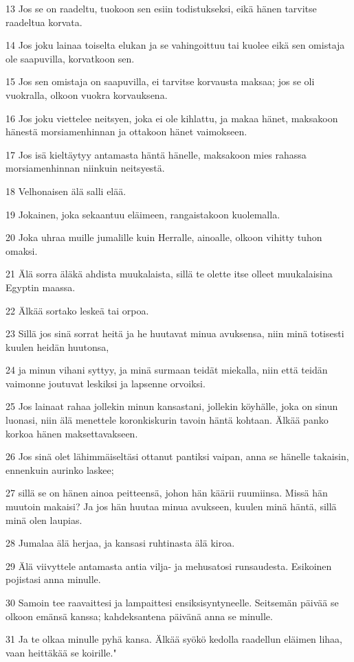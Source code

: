 \par 13 Jos se on raadeltu, tuokoon sen esiin todistukseksi, eikä hänen tarvitse raadeltua korvata.
\par 14 Jos joku lainaa toiselta elukan ja se vahingoittuu tai kuolee eikä sen omistaja ole saapuvilla, korvatkoon sen.
\par 15 Jos sen omistaja on saapuvilla, ei tarvitse korvausta maksaa; jos se oli vuokralla, olkoon vuokra korvauksena.
\par 16 Jos joku viettelee neitsyen, joka ei ole kihlattu, ja makaa hänet, maksakoon hänestä morsiamenhinnan ja ottakoon hänet vaimokseen.
\par 17 Jos isä kieltäytyy antamasta häntä hänelle, maksakoon mies rahassa morsiamenhinnan niinkuin neitsyestä.
\par 18 Velhonaisen älä salli elää.
\par 19 Jokainen, joka sekaantuu eläimeen, rangaistakoon kuolemalla.
\par 20 Joka uhraa muille jumalille kuin Herralle, ainoalle, olkoon vihitty tuhon omaksi.
\par 21 Älä sorra äläkä ahdista muukalaista, sillä te olette itse olleet muukalaisina Egyptin maassa.
\par 22 Älkää sortako leskeä tai orpoa.
\par 23 Sillä jos sinä sorrat heitä ja he huutavat minua avuksensa, niin minä totisesti kuulen heidän huutonsa,
\par 24 ja minun vihani syttyy, ja minä surmaan teidät miekalla, niin että teidän vaimonne joutuvat leskiksi ja lapsenne orvoiksi.
\par 25 Jos lainaat rahaa jollekin minun kansastani, jollekin köyhälle, joka on sinun luonasi, niin älä menettele koronkiskurin tavoin häntä kohtaan. Älkää panko korkoa hänen maksettavakseen.
\par 26 Jos sinä olet lähimmäiseltäsi ottanut pantiksi vaipan, anna se hänelle takaisin, ennenkuin aurinko laskee;
\par 27 sillä se on hänen ainoa peitteensä, johon hän käärii ruumiinsa. Missä hän muutoin makaisi? Ja jos hän huutaa minua avukseen, kuulen minä häntä, sillä minä olen laupias.
\par 28 Jumalaa älä herjaa, ja kansasi ruhtinasta älä kiroa.
\par 29 Älä viivyttele antamasta antia vilja- ja mehusatosi runsaudesta. Esikoinen pojistasi anna minulle.
\par 30 Samoin tee raavaittesi ja lampaittesi ensiksisyntyneelle. Seitsemän päivää se olkoon emänsä kanssa; kahdeksantena päivänä anna se minulle.
\par 31 Ja te olkaa minulle pyhä kansa. Älkää syökö kedolla raadellun eläimen lihaa, vaan heittäkää se koirille."

